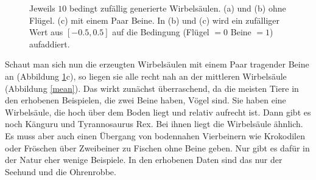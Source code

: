  \begin{figure}
  \qquad
  \qquad
  
  \caption{Jeweils $10$ bedingt zufällig generierte Wirbelsäulen. (a) und (b) ohne Flügel. (c) mit einem Paar Beine. In (b) und (c) wird ein zufälliger Wert aus $[-0.5, 0.5]$ auf die Bedingung (Flügel $= 0$ \bzw Beine $= 1$) aufaddiert.}
  \label{spine_variance}
 \end{figure}

 
 Schaut man sich nun die erzeugten Wirbelsäulen mit einem Paar tragender Beine an (Abbildung \ref{spine_variance}c), so liegen sie alle recht nah an der mittleren Wirbelsäule (Abbildung \ref{mean}).
 Das wirkt zunächst überraschend, da die meisten Tiere in den erhobenen Beispielen, die zwei Beine haben, Vögel sind. Sie haben eine Wirbelsäule, die hoch über dem Boden liegt und relativ aufrecht ist. Dann gibt es noch Känguru und Tyrannosaurus Rex. Bei ihnen liegt die Wirbelsäule ähnlich. Es muss aber auch einen Übergang von bodennahen Vierbeinern wie Krokodilen oder Fröschen über Zweibeiner zu Fischen ohne Beine geben. Nur gibt es dafür in der Natur eher wenige Beispiele. In den erhobenen Daten sind das nur der Seehund und die Ohrenrobbe.
 
